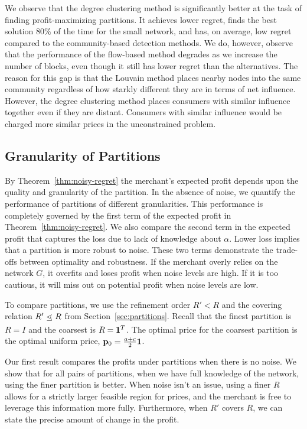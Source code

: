 We observe that the degree clustering method is significantly better at the task of finding profit-maximizing partitions. It achieves lower regret, finds the best solution $80\%$ of the time for the small network, and has, on average, low regret compared to the community-based detection methods. We do, however, observe that the performance of the flow-based method degrades as we increase the number of blocks, even though it still has lower regret than the alternatives. The reason for this gap is that the Louvain method places nearby nodes into the same community regardless of how starkly different they are in terms of net influence. However, the degree clustering method places consumers with similar influence together even if they are distant. Consumers with similar influence would be charged more similar prices in the unconstrained problem.

\subsection{Granularity of Partitions}
By Theorem~\ref{thm:noisy-regret} the merchant's expected profit depends upon the quality and granularity of the partition. In the absence of noise, we quantify the performance of partitions of different granularities. This performance is completely governed by the first term of the expected profit in Theorem~\ref{thm:noisy-regret}. We also compare the second term in the expected profit that captures the loss due to lack of knowledge about $\alpha$. Lower loss implies that a partition is more robust to noise. These two terms demonstrate the trade-offs between optimality and robustness. If the merchant overly relies on the network $G$, it overfits and loses profit when noise levels are high. If it is too cautious, it will miss out on potential profit when noise levels are low.

To compare partitions, we use the refinement order $R' < R$ and the covering relation $R' \leatom R$ from Section~\ref{sec:partitions}. Recall that the finest partition is $R = I$ and the coarsest is $R = \mathbf{1}^T$. The optimal price for the coarsest partition is the optimal uniform price, $\mathbf{p}_0 = \frac{a+c}{2} \mathbf{1}$.

Our first result compares the profits under partitions when there is no noise. We show that for all pairs of partitions, when we have full knowledge of the network, using the finer partition is better. When noise isn't an issue, using a finer $R$ allows for a strictly larger feasible region for prices, and the merchant is free to leverage this information more fully. Furthermore, when $R'$ covers $R$, we can state the precise amount of change in the profit.

